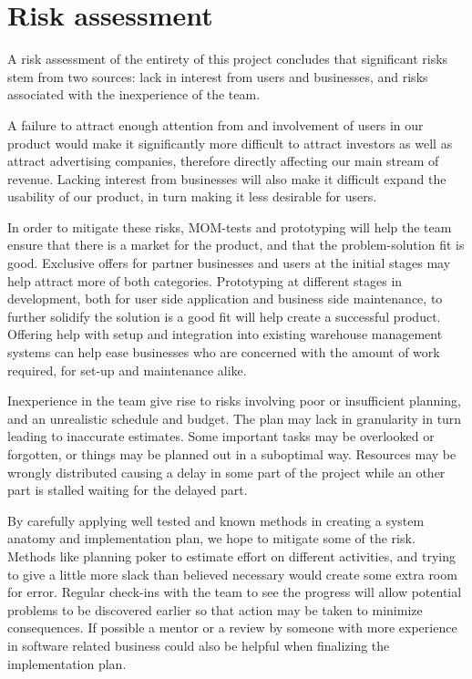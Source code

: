 \documentclass[titlepage]{article}
\begin{document}
\section{Risk assessment}

A risk assessment of the entirety of this project concludes that significant risks stem from two sources: lack in interest from users and businesses, and risks associated with the inexperience of the team.

A failure to attract enough attention from and involvement of users in our product would make it significantly more difficult to attract investors as well as attract advertising companies, therefore directly affecting our main stream of revenue. Lacking interest from businesses will also make it difficult expand the usability of our product, in turn making it less desirable for users.

In order to mitigate these risks, MOM-tests and prototyping will help the team ensure that there is a market for the product, and that the problem-solution fit is good. Exclusive offers for partner businesses and users at the initial stages may help attract more of both categories. Prototyping at different stages in development, both for user side application and business side maintenance, to further solidify the solution is a good fit will help create a successful product. Offering help with setup and integration into existing warehouse management systems can help ease businesses who are concerned with the amount of work required, for set-up and maintenance alike. 

Inexperience in the team give rise to risks involving poor or insufficient planning, and an unrealistic schedule and budget. The plan may lack in granularity in turn leading to inaccurate estimates. Some important tasks may be overlooked or forgotten, or things may be planned out in a suboptimal way. Resources may be wrongly distributed causing a delay in some part of the project while an other part is stalled waiting for the delayed part.

By carefully applying well tested and known methods in creating a system anatomy and implementation plan, we hope to mitigate some of the risk. Methods like planning poker to estimate effort on different activities, and trying to give a little more slack than believed necessary would create some extra room for error. Regular check-ins with the team to see the progress will allow potential problems to be discovered earlier so that action may be taken to minimize consequences. If possible a mentor or a review by someone with more experience in software related business could also be helpful when finalizing the implementation plan.
\end{document}
